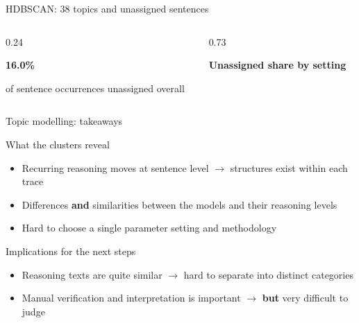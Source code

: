 \documentclass[aspectratio=169, 10pt]{beamer}
\begin{document}
\begin{frame}{HDBSCAN: 38 topics and unassigned sentences}
\begin{columns}[c,onlytextwidth]
  \begin{column}{0.24\textwidth}
    {\Large\bfseries\color{lmudark}16.0\%\par}
    {\small of sentence occurrences unassigned overall\par}
  \end{column}
  \begin{column}{0.73\textwidth}
    \centering
    {\small\bfseries Unassigned share by setting\par}
    \vspace{0.5em}
  \end{column}
\end{columns}
\end{frame}

\begin{frame}{Topic modelling: takeaways}
\begin{block}{What the clusters reveal}
\small 
\begin{itemize}
    \item  Recurring reasoning moves at sentence level $\rightarrow$ structures exist within each trace
    \item Differences \textbf{and} similarities between the models and their reasoning levels
    \item Hard to choose a single parameter setting and methodology
\end{itemize}
\end{block}
\vspace{0.35em}
\begin{block}{Implications for the next steps}
\small
\begin{itemize}
\item Reasoning texts are quite similar $\rightarrow$ hard to separate into distinct categories
\item Manual verification and interpretation is important $\rightarrow$ \textbf{but} very difficult to judge
\end{itemize}
\end{block}
\vspace{0.35em}
\end{frame}
\end{document}

